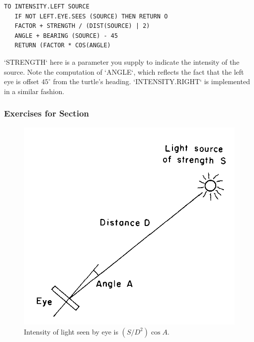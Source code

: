 \documentclass{book}
\begin{document}
\begin{verbatim}
TO INTENSITY.LEFT SOURCE
   IF NOT LEFT.EYE.SEES (SOURCE) THEN RETURN O
   FACTOR + STRENGTH / (DIST(SOURCE) | 2)
   ANGLE + BEARING (SOURCE) - 45
   RETURN (FACTOR * COS(ANGLE) 
\end{verbatim}
\noindent \textsc{`STRENGTH`} here is a parameter you supply to indicate the intensity of
the source. Note the computation of \textsc{`ANGLE`}, which reflects the fact that
the left eye is offset $45^{\circ}$ from the turtle's heading. \textsc{`INTENSITY.RIGHT`} is
implemented in a similar fashion.

\subsubsection{Exercises for Section \thesection}

\begin{figure}
\begin{center}
\includegraphics[scale=1]{fig2-10}
\caption{Intensity of light seen by eye is $(S / D^2) \cos A$.}
\end{center}
\end{figure}
\end{document}
